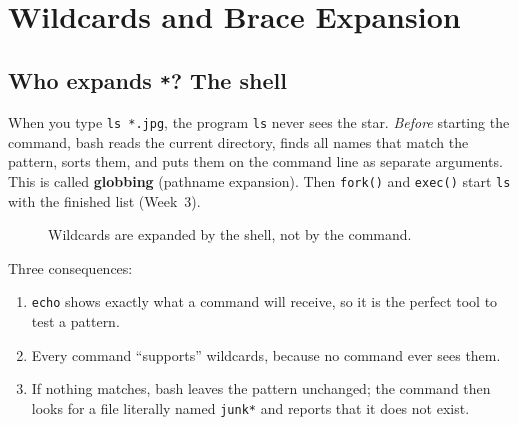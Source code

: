 \documentclass[11pt,a4paper]{article}
\newcommand{\term}[1]{\textbf{\color{mintdeep}#1}}
\newcommand{\cmd}[1]{\texttt{#1}}
\begin{document}
\section{Wildcards and Brace Expansion}
\label{sec:glob}

\subsection{Who expands \texttt{*}? The shell}

When you type \cmd{ls *.jpg}, the program \cmd{ls} never sees the star. \emph{Before} starting the command, bash reads the current directory, finds all names that match the pattern, sorts them, and puts them on the command line as separate arguments. This is called \term{globbing} (pathname expansion). Then \cmd{fork()} and \cmd{exec()} start \cmd{ls} with the finished list (Week~3).

\begin{figure}[H]
\centering
{}
\caption{Wildcards are expanded by the shell, not by the command.}
\end{figure}

Three consequences:
\begin{enumerate}[leftmargin=1.4em]
  \item \cmd{echo} shows exactly what a command will receive, so it is the perfect tool to test a pattern.
  \item Every command ``supports'' wildcards, because no command ever sees them.
  \item If nothing matches, bash leaves the pattern unchanged; the command then looks for a file literally named \texttt{junk*} and reports that it does not exist.
\end{enumerate}
\end{document}
